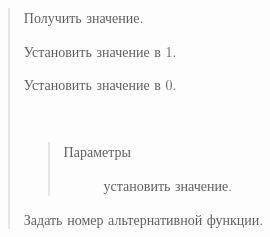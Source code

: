 \documentclass[a4paper,10pt,russian]{sphinxmanual}
\begin{document}
\begin{quote}
\begin{fulllineitems}
\begin{fulllineitems}
\begin{quote}
\begin{description}
\end{description}\end{quote}

\end{fulllineitems}


\begin{fulllineitems}
\label{\detokenize{programming/lua/lua:Gpio.read}}
Получить значение.

\end{fulllineitems}


\begin{fulllineitems}
\label{\detokenize{programming/lua/lua:Gpio.set}}
Установить значение в 1.

\end{fulllineitems}


\begin{fulllineitems}
\label{\detokenize{programming/lua/lua:Gpio.reset}}
Установить значение в 0.

\end{fulllineitems}


\begin{fulllineitems}
\label{\detokenize{programming/lua/lua:Gpio.write}}~\begin{quote}\begin{description}
\item[{Параметры}] \leavevmode
{} \textendash{} установить значение.

\end{description}\end{quote}

\end{fulllineitems}


\begin{fulllineitems}
\label{\detokenize{programming/lua/lua:Gpio.setFunction}}
Задать номер альтернативной функции.


\end{fulllineitems}
\end{fulllineitems}
\end{quote}
\end{document}
